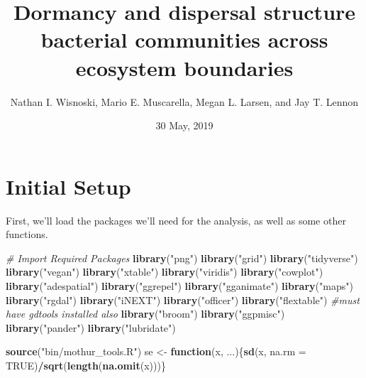 \documentclass[]{article}
\title{Dormancy and dispersal structure bacterial communities across ecosystem
boundaries}
\author{Nathan I. Wisnoski, Mario E. Muscarella, Megan L. Larsen, and Jay T.
Lennon}
\date{30 May, 2019}
\newenvironment{Shaded}{\begin{snugshade}}{\end{snugshade}}
\newcommand{\KeywordTok}[1]{\textcolor[rgb]{0.13,0.29,0.53}{\textbf{#1}}}
\newcommand{\DataTypeTok}[1]{\textcolor[rgb]{0.13,0.29,0.53}{#1}}
\newcommand{\StringTok}[1]{\textcolor[rgb]{0.31,0.60,0.02}{#1}}
\newcommand{\CommentTok}[1]{\textcolor[rgb]{0.56,0.35,0.01}{\textit{#1}}}
\newcommand{\OtherTok}[1]{\textcolor[rgb]{0.56,0.35,0.01}{#1}}
\newcommand{\ControlFlowTok}[1]{\textcolor[rgb]{0.13,0.29,0.53}{\textbf{#1}}}
\newcommand{\OperatorTok}[1]{\textcolor[rgb]{0.81,0.36,0.00}{\textbf{#1}}}
\newcommand{\NormalTok}[1]{#1}
\begin{document}
\maketitle

\section{Initial Setup}\label{initial-setup}

First, we'll load the packages we'll need for the analysis, as well as
some other functions.

\begin{Shaded}
\begin{Highlighting}[]
\CommentTok{# Import Required Packages}
\KeywordTok{library}\NormalTok{(}\StringTok{"png"}\NormalTok{)}
\KeywordTok{library}\NormalTok{(}\StringTok{"grid"}\NormalTok{)}
\KeywordTok{library}\NormalTok{(}\StringTok{"tidyverse"}\NormalTok{)   }
\KeywordTok{library}\NormalTok{(}\StringTok{"vegan"}\NormalTok{)}
\KeywordTok{library}\NormalTok{(}\StringTok{"xtable"}\NormalTok{)}
\KeywordTok{library}\NormalTok{(}\StringTok{"viridis"}\NormalTok{)}
\KeywordTok{library}\NormalTok{(}\StringTok{"cowplot"}\NormalTok{)}
\KeywordTok{library}\NormalTok{(}\StringTok{"adespatial"}\NormalTok{)}
\KeywordTok{library}\NormalTok{(}\StringTok{"ggrepel"}\NormalTok{)}
\KeywordTok{library}\NormalTok{(}\StringTok{"gganimate"}\NormalTok{)}
\KeywordTok{library}\NormalTok{(}\StringTok{"maps"}\NormalTok{)}
\KeywordTok{library}\NormalTok{(}\StringTok{"rgdal"}\NormalTok{)}
\KeywordTok{library}\NormalTok{(}\StringTok{"iNEXT"}\NormalTok{)}
\KeywordTok{library}\NormalTok{(}\StringTok{"officer"}\NormalTok{)}
\KeywordTok{library}\NormalTok{(}\StringTok{"flextable"}\NormalTok{) }\CommentTok{#must have gdtools installed also}
\KeywordTok{library}\NormalTok{(}\StringTok{"broom"}\NormalTok{)}
\KeywordTok{library}\NormalTok{(}\StringTok{"ggpmisc"}\NormalTok{)}
\KeywordTok{library}\NormalTok{(}\StringTok{"pander"}\NormalTok{)}
\KeywordTok{library}\NormalTok{(}\StringTok{"lubridate"}\NormalTok{)}

\KeywordTok{source}\NormalTok{(}\StringTok{"bin/mothur_tools.R"}\NormalTok{)}
\NormalTok{se <-}\StringTok{ }\ControlFlowTok{function}\NormalTok{(x, ...)\{}\KeywordTok{sd}\NormalTok{(x, }\DataTypeTok{na.rm =} \OtherTok{TRUE}\NormalTok{)}\OperatorTok{/}\KeywordTok{sqrt}\NormalTok{(}\KeywordTok{length}\NormalTok{(}\KeywordTok{na.omit}\NormalTok{(x)))\}}
\end{Highlighting}
\end{Shaded}
\end{document}
